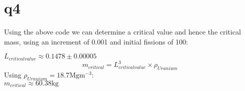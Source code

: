 \documentclass[a4paper,english]{article}
\begin{document}
    \section{q4}
    Using the above code we can determine a critical value and hence the critical mass, using an increment of 0.001 and initial fissions of 100:
    \begin{center}
        $L_{criticalvalue} \approx 0.1478 \pm 0.00005$\\
        \begin{equation*}
            m_{critical} = L_{criticalvalue}^3 \times \rho_{Uranium}
        \end{equation*}
    Using $\rho_{Uranium} = 18.7\textrm{Mgm$^{-3}$}$:\\
        $m_{critical} \approx 60.38\textrm{kg}$
    \end{center}
\end{document}
